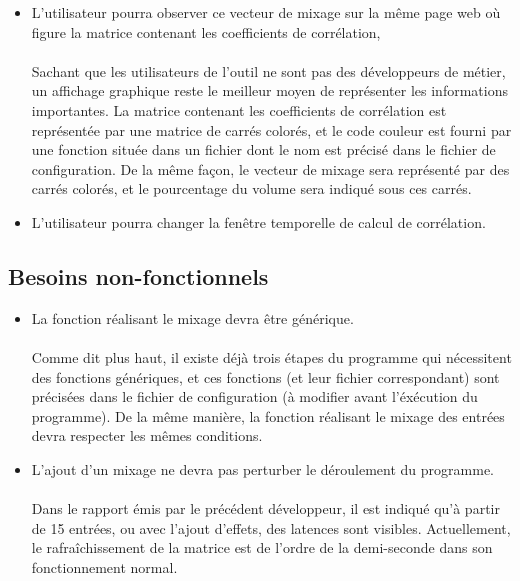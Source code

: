 \documentclass{article}
\begin{document}
\begin{itemize}
       \paragraph{}
       
 \item L'utilisateur pourra observer ce vecteur de mixage sur la même page
       web où figure la matrice contenant les coefficients de corrélation,
       \paragraph{}
       Sachant que les utilisateurs de l'outil ne sont pas des développeurs de
       métier, un affichage graphique reste le meilleur moyen de représenter les
       informations importantes. La matrice contenant les coefficients de
       corrélation est représentée par une matrice de carrés colorés, et le
       code couleur est fourni par une fonction située dans un fichier dont le
       nom est précisé dans le fichier de configuration. De la même façon, le
       vecteur de mixage sera représenté par des carrés colorés, et le
       pourcentage du volume sera indiqué sous ces carrés.\\
       
 \item L'utilisateur pourra changer la fenêtre temporelle de calcul de
       corrélation.
\end{itemize}
\subsection{Besoins non-fonctionnels}
\begin{itemize}
 \item La fonction réalisant le mixage devra être générique.
       \paragraph{}
       Comme dit plus haut, il existe déjà trois étapes du programme qui
       nécessitent des fonctions génériques, et ces fonctions (et leur fichier
       correspondant) sont précisées dans le fichier de configuration (à
       modifier avant l'éxécution du programme). De la même manière, la
       fonction réalisant le mixage des entrées devra respecter les mêmes
       conditions.
 \item L'ajout d'un mixage ne devra pas perturber le déroulement du programme.
       \paragraph{}
       Dans le rapport émis par le précédent développeur, il est indiqué qu'à
       partir de 15 entrées, ou avec l'ajout d'effets, des latences sont
       visibles. Actuellement, le rafraîchissement de la matrice est de l'ordre
       de la demi-seconde dans son fonctionnement normal.
\end{itemize}
\end{document}
